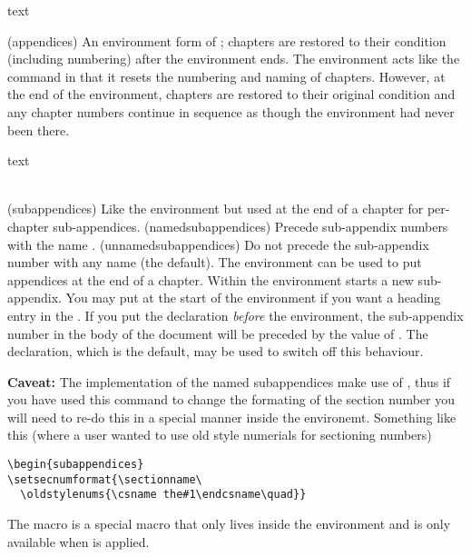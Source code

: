 \begin{syntax}
 text \\
\end{syntax}
\glossary(appendices)%
  {}%
  {An environment form of ; chapters are restored to their condition
   (including numbering) after the environment ends.}
The  environment acts like the \cmd{\appendix} 
command in that it resets the numbering and naming of chapters. 
However, at the end of the environment, chapters are restored to their original 
condition and any chapter numbers continue in sequence as though the 
 environment had never been there.

\begin{syntax}
 text  \\
\cmd{\namedsubappendices} \cmd{\unnamedsubappendices} \\
\end{syntax}
\glossary(subappendices)%
  {}%
  {Like the  environment but used at the end of a chapter
   for per-chapter sub-appendices.}
\glossary(namedsubappendices)%
  {}%
  {Precede sub-appendix numbers with the name .}
\glossary(unnamedsubappendices)%
  {}%
  {Do not precede the sub-appendix number with any name (the default).}
The  environment can be used to put appendices at the end
of a chapter. Within the environment \cmd{\section} starts a 
new sub-appendix. You may put \cmd{\addappheadtotoc} at the start
of the environment if you want a heading entry in the \toc.
If you put the declaration \cmd{\namedsubappendices}
\emph{before} the  environment, the sub-appendix number
in the body of the document will be preceded by the value of 
\cmd{\appendixname}. The \cmd{\unnamedsubappendices} declaration, which is the 
default, may be used to switch off this behaviour.

\textbf{Caveat:} The implementation of the named subappendices make
use of \cmd{\setsecnumformat}, thus if you have used this command to
change the formating of the section number you will need to re-do this
in a special manner inside the 
environemt. Something like this (where a user wanted to use old style
numerials for sectioning numbers)
\begin{verbatim}
\begin{subappendices}
\setsecnumformat{\sectionname\ 
  \oldstylenums{\csname the#1\endcsname\quad}}
\end{verbatim}
The macro  is a special macro that only lives inside
the \Ie{subappendices} environment and is only available when
\cmd{\namedsubappendices} is applied.



